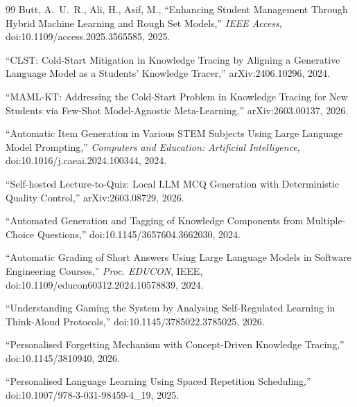 \documentclass[12pt]{report}
\begin{document}
\begin{thebibliography}{99}
 Butt, A.~U.~R., Ali, H., Asif, M., ``Enhancing Student Management Through Hybrid Machine Learning and Rough Set Models,'' \textit{IEEE Access}, doi:10.1109/access.2025.3565585, 2025.

 ``CLST: Cold-Start Mitigation in Knowledge Tracing by Aligning a Generative Language Model as a Students' Knowledge Tracer,'' arXiv:2406.10296, 2024.

 ``MAML-KT: Addressing the Cold-Start Problem in Knowledge Tracing for New Students via Few-Shot Model-Agnostic Meta-Learning,'' arXiv:2603.00137, 2026.

 ``Automatic Item Generation in Various STEM Subjects Using Large Language Model Prompting,'' \textit{Computers and Education: Artificial Intelligence}, doi:10.1016/j.caeai.2024.100344, 2024.

 ``Self-hosted Lecture-to-Quiz: Local LLM MCQ Generation with Deterministic Quality Control,'' arXiv:2603.08729, 2026.

 ``Automated Generation and Tagging of Knowledge Components from Multiple-Choice Questions,'' doi:10.1145/3657604.3662030, 2024.

 ``Automatic Grading of Short Answers Using Large Language Models in Software Engineering Courses,'' \textit{Proc. EDUCON}, IEEE, doi:10.1109/educon60312.2024.10578839, 2024.

 ``Understanding Gaming the System by Analysing Self-Regulated Learning in Think-Aloud Protocols,'' doi:10.1145/3785022.3785025, 2026.

 ``Personalised Forgetting Mechanism with Concept-Driven Knowledge Tracing,'' doi:10.1145/3810940, 2026.

 ``Personalised Language Learning Using Spaced Repetition Scheduling,'' doi:10.1007/978-3-031-98459-4\_19, 2025.

\end{thebibliography}
\end{document}
